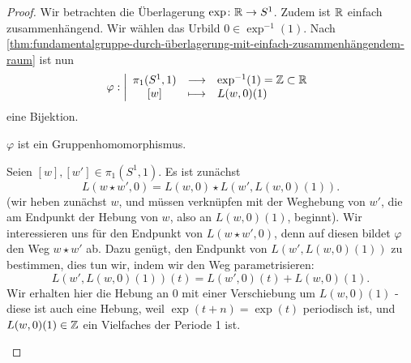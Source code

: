 \begin{proof}
    Wir betrachten die Überlagerung $\exp \colon  \mathbb{R} \to  S^1$. Zudem ist $\mathbb{R}$ einfach zusammenhängend. Wir wählen das Urbild $0\in \exp ^{-1}(1)$. Nach \autoref{thm:fundamentalgruppe-durch-überlagerung-mit-einfach-zusammenhängendem-raum} ist nun
        \begin{equation*}
        \varphi : \left| \begin{array}{c c l} 
            \pi_1(S^1,1) & \longrightarrow & \exp ^{-1}(1) = \mathbb{Z} \subset \mathbb{R} \\
            \left[w\right] & \longmapsto &  L(w,0)(1)
        \end{array} \right.
    \end{equation*}
    eine Bijektion.
    \begin{claim}
        $\varphi $ ist ein Gruppenhomomorphismus.
    \end{claim}
    \begin{subproof}
    Seien $[w],[w'] \in \pi_1(S^1,1)$. Es ist zunächst
    \[
        L(w\star w', 0) = L(w,0) \star L(w',L(w,0)(1))
    .\]
    (wir heben zunächst $w$, und müssen verknüpfen mit der Weghebung von  $w'$, die am Endpunkt der Hebung von  $w$, also an  $L(w,0)(1)$, beginnt). Wir interessieren uns für den Endpunkt von $L(w\star w',0)$, denn auf diesen bildet  $\varphi $ den Weg $w \star w'$ ab. Dazu genügt, den Endpunkt von  $L(w', L(w,0)(1))$ zu bestimmen, dies tun wir, indem wir den Weg parametrisieren:
    \[
        L(w',L(w,0)(1))(t) = L(w',0)(t) + L(w,0)(1)
    .\] 
    Wir erhalten hier die Hebung an $0$ mit einer Verschiebung um  $L(w,0)(1)$ - diese ist auch eine Hebung, weil  $\exp (t+n) = \exp (t)$ periodisch ist, und $L(w,0)(1)\in \mathbb{Z}$ ein Vielfaches der Periode 1 ist.


\end{subproof}
\end{proof}

